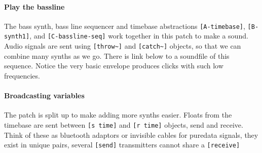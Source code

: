 \paragraph{Play the bassline}
The bass synth, bass line sequencer and timebase abstractions 
\verb+[A-timebase]+, \verb+[B-synth1]+, and \verb+[C-bassline-seq]+
work together in this patch to make a sound.
Audio signals are sent using \verb+[throw~]+
and \verb+[catch~]+ objects, so that we can combine many synths as we go.
There is link below to a soundfile of this sequence. Notice the very
basic envelope produces clicks with such low frequencies.

\paragraph{Broadcasting variables}
The patch is split up to make adding more synths easier. Floats from
the timebase are sent between \verb+[s time]+ and \verb+[r time]+
objects, send and receive. Think of these as bluetooth adaptors or
invisible cables for puredata signals, they exist in unique pairs,
several \verb+[send]+ transmitters cannot share a \verb+[receive]+


